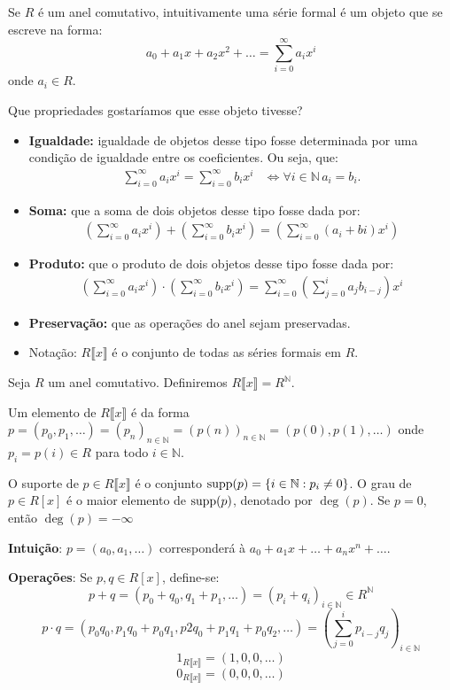Se $R$ é um anel comutativo, intuitivamente uma série formal é um objeto que se escreve na forma:
$$a_0+a_1x+a_2x^2+\dots=\sum_{i=0}^\infty a_ix^i$$
onde $a_i\in R$.

Que propriedades gostaríamos que esse objeto tivesse?

\begin{itemize}
    \item \textbf{Igualdade:} igualdade de objetos desse tipo fosse determinada por uma condição de igualdade entre os coeficientes. Ou seja, que:
    \begin{align*}
      \sum_{i=0}^\infty a_ix^i=\sum_{i=0}^\infty b_ix^i & \Leftrightarrow \forall i\in \mathbb N\, a_i=b_i.
    \end{align*}
    \item \textbf{Soma:} que a soma de dois objetos desse tipo fosse dada por:
    \begin{align*}
        \left(\sum_{i=0}^\infty a_ix^i\right)+\left(\sum_{i=0}^\infty b_ix^i\right)=\left(\sum_{i=0}^\infty (a_i+bi)x^i\right)
    \end{align*}
    \item \textbf{Produto:} que o produto de dois objetos desse tipo fosse dada por:
    \begin{align*}
        \left(\sum_{i=0}^\infty a_ix^i\right)\cdot\left(\sum_{i=0}^\infty b_ix^i\right)=\sum_{i=0}^\infty \left(\sum_{j=0}^i a_{j}b_{i-j}\right)x^i
    \end{align*}
    \item \textbf{Preservação:} que as operações do anel sejam preservadas.
    \item Notação: $R\llbracket x \rrbracket$ é o conjunto de todas as séries formais em $R$.
\end{itemize}

\begin{definition}
Seja $R$ um anel comutativo. Definiremos $R\llbracket x\rrbracket=R^{\mathbb N}$.


Um elemento de $R\llbracket x\rrbracket$ é da forma $p=(p_0, p_1, \dots)=(p_n)_{n \in \mathbb N}=(p(n))_{n \in \mathbb N}=(p(0), p(1), \dots)$ onde $p_i=p(i)\in R$  para todo $i \in \mathbb N$.

O suporte de $p\in R\llbracket x\rrbracket$ é o conjunto $\operatorname{supp}(p)=\{i \in \mathbb N: p_i \neq 0\}$.
O grau de $p \in R[x]$ é o maior elemento de $\operatorname{supp}(p)$, denotado por $\deg(p)$. Se $p=0$, então $\deg(p)=-\infty$

\textbf{Intuição}: $p=(a_0, a_1, \dots)$ corresponderá à $a_0+a_1x+\dots+a_n x^n+\dots$.

\textbf{Operações}:
Se $p, q \in R[x]$, define-se:
$$p+q=(p_0+q_0, q_1+p_1, \dots)=(p_i+q_i)_{i \in \mathbb N}\in R^{\mathbb N}$$
$$p\cdot q=(p_0q_0, p_1q_0+p_0q_1, p2q_0+p_1q_1+p_0q_2, \dots)=\left(\sum_{j=0}^i p_{i-j}q_j\right)_{i \in \mathbb N}$$
$$1_{R\llbracket x\rrbracket}=(1, 0, 0, \dots)$$
$$0_{R\llbracket x\rrbracket}=(0, 0, 0, \dots)$$
\end{definition}

